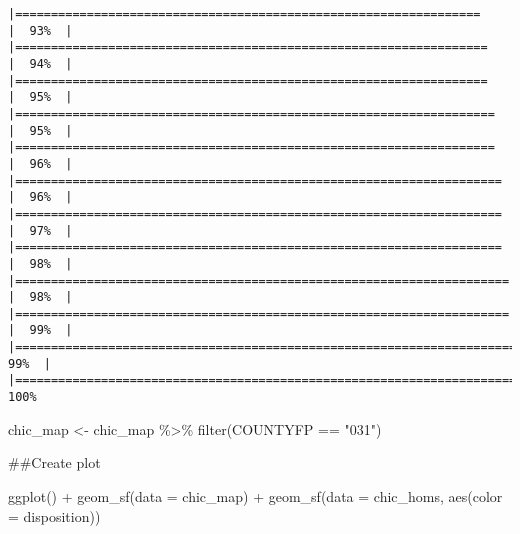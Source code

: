 \documentclass[
]{article}
\newenvironment{Shaded}{\begin{snugshade}}{\end{snugshade}}
\newcommand{\AttributeTok}[1]{\textcolor[rgb]{0.77,0.63,0.00}{#1}}
\newcommand{\FunctionTok}[1]{\textcolor[rgb]{0.00,0.00,0.00}{#1}}
\newcommand{\NormalTok}[1]{#1}
\newcommand{\OtherTok}[1]{\textcolor[rgb]{0.56,0.35,0.01}{#1}}
\newcommand{\SpecialCharTok}[1]{\textcolor[rgb]{0.00,0.00,0.00}{#1}}
\newcommand{\StringTok}[1]{\textcolor[rgb]{0.31,0.60,0.02}{#1}}
\begin{document}
\begin{verbatim}
|=================================================================     |  93%  |                                                                              |==================================================================    |  94%  |                                                                              |==================================================================    |  95%  |                                                                              |===================================================================   |  95%  |                                                                              |===================================================================   |  96%  |                                                                              |====================================================================  |  96%  |                                                                              |====================================================================  |  97%  |                                                                              |====================================================================  |  98%  |                                                                              |===================================================================== |  98%  |                                                                              |===================================================================== |  99%  |                                                                              |======================================================================|  99%  |                                                                              |======================================================================| 100%
\end{verbatim}

\begin{Shaded}
\begin{Highlighting}[]
\NormalTok{chic\_map }\OtherTok{\textless{}{-}}\NormalTok{ chic\_map }\SpecialCharTok{\%\textgreater{}\%}
  \FunctionTok{filter}\NormalTok{(COUNTYFP }\SpecialCharTok{==} \StringTok{"031"}\NormalTok{)}
\end{Highlighting}
\end{Shaded}

\#\#Create plot

\begin{Shaded}
\begin{Highlighting}[]
\FunctionTok{ggplot}\NormalTok{() }\SpecialCharTok{+}
  \FunctionTok{geom\_sf}\NormalTok{(}\AttributeTok{data =}\NormalTok{ chic\_map) }\SpecialCharTok{+}
  \FunctionTok{geom\_sf}\NormalTok{(}\AttributeTok{data =}\NormalTok{ chic\_homs, }\FunctionTok{aes}\NormalTok{(}\AttributeTok{color =}\NormalTok{ disposition))}
\end{Highlighting}
\end{Shaded}
\end{document}
